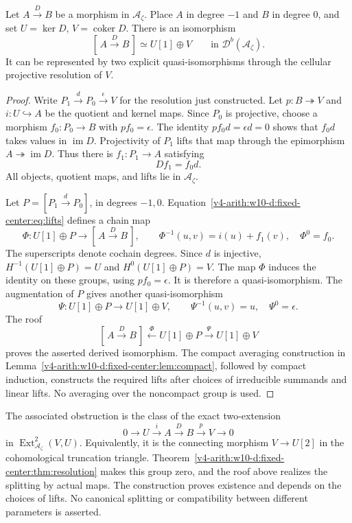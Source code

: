 \begin{theorem}\label{v4-arith:w10-d:fixed-center:thm:split}
Let $A\xrightarrow{D}B$ be a morphism in $\mathcal A_\zeta$.
Place $A$ in degree $-1$ and $B$ in degree $0$, and set
$U=\ker D$, $V=\operatorname{coker} D$.
There is an isomorphism
\[
 [\,A\xrightarrow{D}B\,]\simeq U[1]\oplus V
 \qquad\text{in }\mathcal D^b(\mathcal A_\zeta).
\]
It can be represented by two explicit quasi-isomorphisms through the cellular projective resolution of $V$.
\end{theorem}
\begin{proof}
Write $P_1\xrightarrow{d}P_0\xrightarrow{\epsilon}V$ for the resolution just constructed.
Let $p:B\twoheadrightarrow V$ and $i:U\hookrightarrow A$ be the quotient and kernel maps.
Since $P_0$ is projective, choose a morphism $f_0:P_0\to B$ with $pf_0=\epsilon$.
The identity $pf_0d=\epsilon d=0$ shows that $f_0d$ takes values in $\operatorname{im}D$.
Projectivity of $P_1$ lifts that map through the epimorphism $A\twoheadrightarrow\operatorname{im}D$.
Thus there is $f_1:P_1\to A$ satisfying
\begin{equation}\label{v4-arith:w10-d:fixed-center:eq:lifts}
 Df_1=f_0d.
\end{equation}
All objects, quotient maps, and lifts lie in $\mathcal A_\zeta$.

Let $P=[P_1\xrightarrow{d}P_0]$, in degrees $-1,0$.
Equation~\eqref{v4-arith:w10-d:fixed-center:eq:lifts} defines a chain map
\[
 \Phi:U[1]\oplus P\longrightarrow[\,A\xrightarrow{D}B\,],
 \qquad
 \Phi^{-1}(u,v)=i(u)+f_1(v),\quad \Phi^0=f_0.
\]
The superscripts denote cochain degrees.
Since $d$ is injective, $H^{-1}(U[1]\oplus P)=U$ and $H^0(U[1]\oplus P)=V$.
The map $\Phi$ induces the identity on these groups, using $pf_0=\epsilon$.
It is therefore a quasi-isomorphism.
The augmentation of $P$ gives another quasi-isomorphism
\[
 \Psi:U[1]\oplus P\longrightarrow U[1]\oplus V,
 \qquad \Psi^{-1}(u,v)=u,\quad \Psi^0=\epsilon.
\]
The roof
\[
 [\,A\xrightarrow{D}B\,]\xleftarrow{\ \Phi\ }U[1]\oplus P
 \xrightarrow{\ \Psi\ }U[1]\oplus V
\]
proves the asserted derived isomorphism.
The compact averaging construction in Lemma~\ref{v4-arith:w10-d:fixed-center:lem:compact}, followed by compact induction,
constructs the required lifts after choices of irreducible summands and linear lifts.
No averaging over the noncompact group is used.
\end{proof}

The associated obstruction is the class of the exact two-extension
\[
 0\longrightarrow U\xrightarrow{i}A\xrightarrow{D}B\xrightarrow{p}V\longrightarrow0
\]
in $\operatorname{Ext}^2_{\mathcal A_\zeta}(V,U)$.
Equivalently, it is the connecting morphism $V\to U[2]$ in the cohomological truncation triangle.
Theorem~\ref{v4-arith:w10-d:fixed-center:thm:resolution} makes this group zero, and the roof above realizes the splitting by actual maps.
The construction proves existence and depends on the choices of lifts.
No canonical splitting or compatibility between different parameters is asserted.

